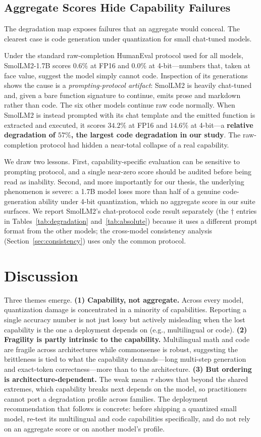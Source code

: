 \documentclass[11pt]{article}
\begin{document}
\subsection{Aggregate Scores Hide Capability Failures}
\label{sec:hidden}

The degradation map exposes failures that an aggregate would conceal. The clearest
case is code generation under quantization for small chat-tuned models.

Under the standard raw-completion HumanEval protocol used for all models,
SmolLM2-1.7B scores $0.6\%$ at FP16 and $0.0\%$ at 4-bit---numbers that, taken at
face value, suggest the model simply cannot code. Inspection of its generations
shows the cause is a \emph{prompting-protocol artifact}: SmolLM2 is heavily
chat-tuned and, given a bare function signature to continue, emits prose and
markdown rather than code. The six other models continue raw code normally. When
SmolLM2 is instead prompted with its chat template and the emitted function is
extracted and executed, it scores $34.2\%$ at FP16 and $14.6\%$ at 4-bit---a
\textbf{relative degradation of $57\%$, the largest code degradation in our
study}. The raw-completion protocol had hidden a near-total collapse of a real
capability.

We draw two lessons. First, capability-specific evaluation can be sensitive to
prompting protocol, and a single near-zero score should be audited before being
read as inability. Second, and more importantly for our thesis, the underlying
phenomenon is severe: a 1.7B model loses more than half of a genuine
code-generation ability under 4-bit quantization, which no aggregate score in our
suite surfaces. We report SmolLM2's chat-protocol code result separately (the
$\dagger$ entries in Tables~\ref{tab:degradation} and~\ref{tab:absolute}) because
it uses a different prompt format from the other models; the cross-model
consistency analysis (Section~\ref{sec:consistency}) uses only the common
protocol.

\section{Discussion}

Three themes emerge. \textbf{(1) Capability, not aggregate.} Across every model,
quantization damage is concentrated in a minority of capabilities. Reporting a
single accuracy number is not just lossy but actively misleading when the lost
capability is the one a deployment depends on (e.g., multilingual or code).
\textbf{(2) Fragility is partly intrinsic to the capability.} Multilingual math
and code are fragile across architectures while commonsense is robust, suggesting
the brittleness is tied to what the capability demands---long multi-step
generation and exact-token correctness---more than to the architecture.
\textbf{(3) But ordering is architecture-dependent.} The weak mean $\tau$ shows
that beyond the shared extremes, which capability breaks next depends on the
model, so practitioners cannot port a degradation profile across families. The
deployment recommendation that follows is concrete: before shipping a quantized
small model, re-test its multilingual and code capabilities specifically, and do
not rely on an aggregate score or on another model's profile.
\end{document}
